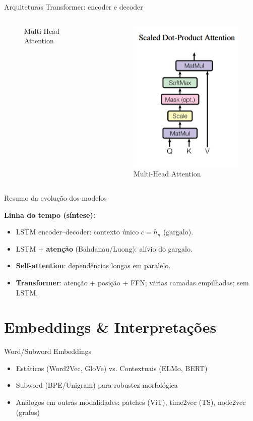 \documentclass{beamer}
\begin{document}
\begin{frame}{Arquiteturas Transformer: encoder e decoder \cite{vaswani2017attention}}
\begin{columns}[t]
\begin{figure}
		\caption{Multi-Head Attention}
	\end{figure}
	\begin{figure}
		\centering
		\includegraphics[height=0.75\textheight]{assets/transformer-scaled-dot-attention.png}
		\caption{Multi-Head Attention}
	\end{figure}
\end{columns}
\end{frame}
\begin{frame}{Resumo da evolução dos modelos}

	\textbf{Linha do tempo (síntese):}
	\begin{itemize}
		\item LSTM encoder--decoder: contexto único $c=h_n$ (gargalo).
		\item LSTM + \textbf{atenção} (Bahdanau/Luong): alívio do gargalo.
		\item \textbf{Self-attention}: dependências longas em paralelo.
		\item \textbf{Transformer}: atenção + posição + FFN; várias camadas empilhadas; sem LSTM.
	\end{itemize}
\end{frame}

\section{Embeddings \& Interpretações}
\begin{frame}{Word/Subword Embeddings}
	\begin{itemize}
		\item Estáticos (Word2Vec, GloVe) vs. Contextuais (ELMo, BERT)
		\item Subword (BPE/Unigram) para robustez morfológica
		\item Análogos em outras modalidades: patches (ViT), time2vec (TS), node2vec (grafos)
	\end{itemize}
\end{frame}
\end{document}
